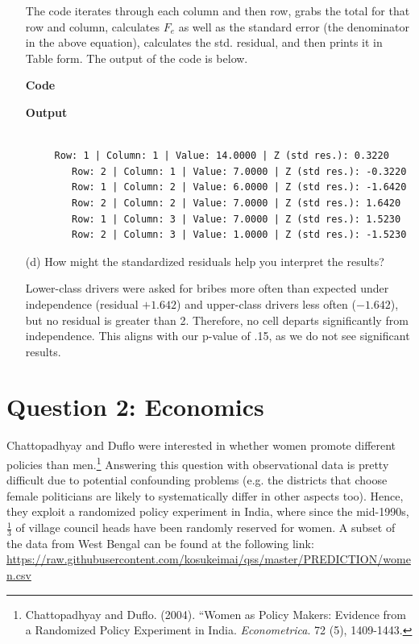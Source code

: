 \documentclass[12pt,letterpaper]{article}
\begin{document}
\begin{enumerate}
	The code iterates through each column and then row, grabs the total for that row and column, calculates $F_e$ as well as the standard error (the denominator in the above equation), calculates the std. residual, and then prints it in Table form. The output of the code is below.
	\vspace{.5cm}


	\textbf{Code}
    
	\vspace{1cm}
    \textbf{Output}
	\begin{verbatim}

	 Row: 1 | Column: 1 | Value: 14.0000 | Z (std res.): 0.3220
		Row: 2 | Column: 1 | Value: 7.0000 | Z (std res.): -0.3220
		Row: 1 | Column: 2 | Value: 6.0000 | Z (std res.): -1.6420
		Row: 2 | Column: 2 | Value: 7.0000 | Z (std res.): 1.6420
		Row: 1 | Column: 3 | Value: 7.0000 | Z (std res.): 1.5230
		Row: 2 | Column: 3 | Value: 1.0000 | Z (std res.): -1.5230
	\end{verbatim}
	
	
	\vspace{2cm}
	\item [(d)] How might the standardized residuals help you interpret the results?  
	
	\vspace{1cm}
	Lower-class drivers were asked for bribes more often than expected under independence (residual $+1.642$) and upper-class drivers less often ($-1.642$), but no residual is greater than 2. Therefore, no cell departs significantly from independence. This aligns with our p-value of .15, as we do not see significant results.
	
\end{enumerate}
\newpage

\section*{Question 2: Economics}
Chattopadhyay and Duflo were interested in whether women promote different policies than men.\footnote{Chattopadhyay and Duflo. (2004). ``Women as Policy Makers: Evidence from a Randomized Policy Experiment in India. \textit{Econometrica}. 72 (5), 1409-1443.} Answering this question with observational data is pretty difficult due to potential confounding problems (e.g. the districts that choose female politicians are likely to systematically differ in other aspects too). Hence, they exploit a randomized policy experiment in India, where since the mid-1990s, $\frac{1}{3}$ of village council heads have been randomly reserved for women. A subset of the data from West Bengal can be found at the following link: \url{https://raw.githubusercontent.com/kosukeimai/qss/master/PREDICTION/women.csv}\\
\end{document}
